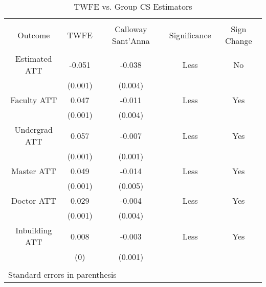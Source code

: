 
\begin{table}[h] \centering 
  \caption{TWFE vs. Group CS Estimators} 
  \label{} 
\begin{tabular}{@{\extracolsep{5pt}} ccccc} 
\\[-1.8ex]\hline 
\hline \\[-1.8ex] 
Outcome & TWFE & Calloway Sant'Anna & Significance & Sign Change \\ 
\hline \\[-1.8ex] 
Estimated ATT & -0.051 & -0.038 & Less & No \\ 
 & (0.001) & (0.004) &  &  \\ 
Faculty ATT & 0.047 & -0.011 & Less & Yes \\ 
 & (0.001) & (0.004) &  &  \\ 
Undergrad ATT & 0.057 & -0.007 & Less & Yes \\ 
 & (0.001) & (0.001) &  &  \\ 
Master ATT & 0.049 & -0.014 & Less & Yes \\ 
 & (0.001) & (0.005) &  &  \\ 
Doctor ATT & 0.029 & -0.004 & Less & Yes \\ 
 & (0.001) & (0.004) &  &  \\ 
Inbuilding ATT & 0.008 & -0.003 & Less & Yes \\ 
 & (0) & (0.001) &  &  \\ 
\hline \\[-1.8ex] 
\multicolumn{5}{l}{Standard errors in parenthesis} \\ 
\end{tabular} 
\end{table} 
